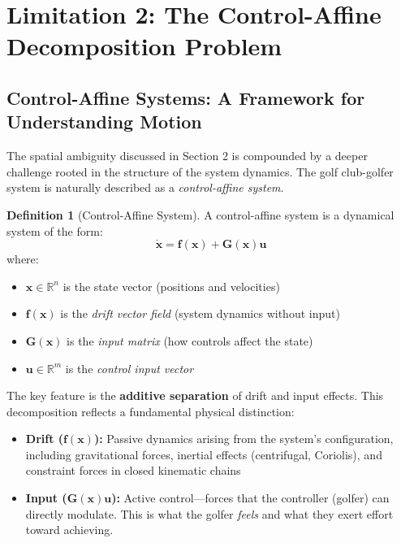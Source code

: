 \documentclass[11pt,a4paper]{article}
\newcommand{\bvec}[1]{\mathbf{#1}}
\theoremstyle{definition}
\newtheorem{definition}{Definition}[section]
\theoremstyle{plain}
\begin{document}
\section{Limitation 2: The Control-Affine Decomposition Problem}

\subsection{Control-Affine Systems: A Framework for Understanding Motion}

The spatial ambiguity discussed in Section 2 is compounded by a deeper challenge rooted in the structure of the system dynamics. The golf club-golfer system is naturally described as a \emph{control-affine system}.

\begin{definition}[Control-Affine System]
A control-affine system is a dynamical system of the form:
\begin{equation}
\label{eq:control_affine}
\dot{\bvec{x}} = \bvec{f}(\bvec{x}) + \bvec{G}(\bvec{x})\bvec{u}
\end{equation}
where:
\begin{itemize}
    \item $\bvec{x} \in \mathbb{R}^n$ is the state vector (positions and velocities)
    \item $\bvec{f}(\bvec{x})$ is the \emph{drift vector field} (system dynamics without input)
    \item $\bvec{G}(\bvec{x})$ is the \emph{input matrix} (how controls affect the state)
    \item $\bvec{u} \in \mathbb{R}^m$ is the \emph{control input vector}
\end{itemize}
\end{definition}

The key feature is the \textbf{additive separation} of drift and input effects. This decomposition reflects a fundamental physical distinction:

\begin{itemize}
    \item \textbf{Drift ($\bvec{f}(\bvec{x})$):} Passive dynamics arising from the system's configuration, including gravitational forces, inertial effects (centrifugal, Coriolis), and constraint forces in closed kinematic chains
    
    \item \textbf{Input ($\bvec{G}(\bvec{x})\bvec{u}$):} Active control—forces that the controller (golfer) can directly modulate. This is what the golfer \emph{feels} and what they exert effort toward achieving.
\end{itemize}
\end{document}
